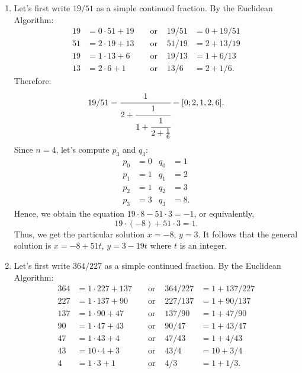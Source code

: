 \begin{solution}
    \begin{enumerate}
        \item Let's first write $19/51$ as a simple continued fraction. By the Euclidean Algorithm:
        \begin{align*}
            19 &= 0\cdot 51 + 19 & &\text{ or } & 19/51 &= 0 + 19/51 \\
            51 &= 2\cdot 19 + 13 & &\text{ or } & 51/19 &= 2 + 13/19 \\
            19 &= 1\cdot 13 + 6 & &\text{ or } & 19/13 &= 1 + 6/13 \\
            13 &= 2\cdot 6 + 1 & &\text{ or } & 13/6 &= 2 + 1/6.
        \end{align*}
        Therefore:
        $$19/51 = \cfrac{1}{
            2 + \cfrac{1}{
                1 + \cfrac{1}{
                    2 + \frac{1}{6}
                }
            }
        } = [0; 2, 1, 2, 6].$$
        Since $n = 4$, let's compute $p_3$ and $q_3$:
        \begin{align*}
            p_0 &= 0 & q_0 &= 1 \\
            p_1 &= 1 & q_1 &= 2 \\
            p_2 &= 1 & q_2 &= 3 \\
            p_3 &= 3 & q_3 &= 8.
        \end{align*}
        Hence, we obtain the equation $19\cdot 8 - 51 \cdot 3 = -1$, or equivalently,
        $$19\cdot (-8) + 51 \cdot 3 = 1.$$
        Thus, we get the particular solution $x = -8$, $y = 3$. It follows that the general solution is $x = -8 + 51t$, $y = 3 - 19t$ where $t$ is an integer.
        \item Let's first write $364/227$ as a simple continued fraction. By the Euclidean Algorithm:
        \begin{align*}
            364 &= 1\cdot 227 + 137 & &\text{ or } & 364/227 &= 1 + 137/227 \\
            227 &= 1\cdot 137 + 90 & &\text{ or } & 227/137 &= 1 + 90/137 \\
            137 &= 1\cdot 90 + 47 & &\text{ or } & 137/90 &= 1 + 47/90 \\
            90 &= 1\cdot 47 + 43 & &\text{ or } & 90/47 &= 1 + 43/47 \\
            47 &= 1\cdot 43 + 4 & &\text{ or } & 47/43 &= 1 + 4/43 \\
            43 &= 10\cdot 4 + 3 & &\text{ or } & 43/4 &= 10 + 3/4 \\
            4 &= 1\cdot 3 + 1 & &\text{ or } & 4/3 &= 1 + 1/3.

\end{align*}
\end{enumerate}
\end{solution}
